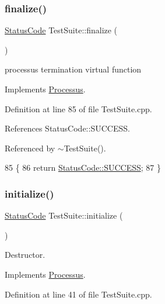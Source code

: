 \subsubsection{\texorpdfstring{finalize()}{finalize()}}
{\footnotesize\ttfamily \hyperlink{classStatusCode}{Status\+Code} Test\+Suite\+::finalize (\begin{DoxyParamCaption}{ }\end{DoxyParamCaption})\hspace{0.3cm}{\ttfamily [virtual]}}

processus termination virtual function 

Implements \hyperlink{classProcessus_aba93d691f031bdb18ae4b8afb1b2e856}{Processus}.



Definition at line 85 of file Test\+Suite.\+cpp.



References Status\+Code\+::\+S\+U\+C\+C\+E\+SS.



Referenced by $\sim$\+Test\+Suite().


\begin{DoxyCode}
85                                  \{  
86   \textcolor{keywordflow}{return} \hyperlink{classStatusCode_a6f565cbeadc76d14c72f047e5e85eb4badd0da38d3ba0d922efd1f4619bc37ad8}{StatusCode::SUCCESS};
87 \}
\end{DoxyCode}
\mbox{\label{classTestSuite_a78793d8c648ce1c47671c263014ab394}} 
\subsubsection{\texorpdfstring{initialize()}{initialize()}}
{\footnotesize\ttfamily \hyperlink{classStatusCode}{Status\+Code} Test\+Suite\+::initialize (\begin{DoxyParamCaption}{ }\end{DoxyParamCaption})\hspace{0.3cm}{\ttfamily [virtual]}}



Destructor. 



Implements \hyperlink{classProcessus_aee88ad7b77ae7319cf8b128e9dd2ea11}{Processus}.



Definition at line 41 of file Test\+Suite.\+cpp.



